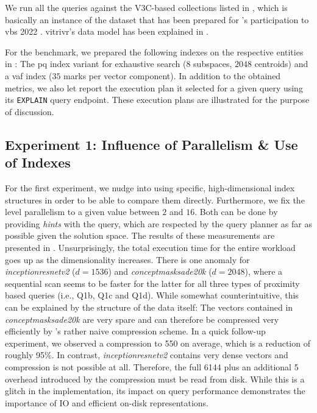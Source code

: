 We run all the queries against the V3C-based collections listed in , which is basically an instance of the dataset that has been prepared for \vitrivr{}'s \cite{Rossetto:2016Vitrivr,Gasser:2019Multimodal} participation to \acrshort{vbs} 2022 \cite{Heller:2022Multi}. vitrivr's data model has been explained in . 

For the benchmark, we prepared the following indexes on the respective entities in \cottontail{}: The \acrshort{pq} index variant for exhaustive search ($8$ subspaces, $2048$ centroids) and a \acrshort{vaf} index ($35$ marks per vector component). In addition to the obtained metrics, we also let \cottontail{} report the execution plan it selected for a given query using its \texttt{EXPLAIN} query endpoint. These execution plans are illustrated for the purpose of discussion.

\subsection{Experiment 1: Influence of Parallelism \& Use of Indexes}
For the first experiment, we nudge \cottontail{} into using specific, high-dimensional index structures in order to be able to compare them directly. Furthermore, we fix the level parallelism to a given value between $2$ and $16$. Both can be done by providing \emph{hints} with the query, which are respected by the query planner as far as possible given the solution space. The results of these measurements are presented in . Unsurprisingly, the total execution time for the entire workload goes up as the dimensionality increases. There is one anomaly for \emph{inceptionresnetv2} ($d = 1536$) and \emph{conceptmasksade20k} ($d = 2048$), where a sequential scan seems to be faster for the latter for all three types of proximity based queries (i.e., Q1b, Q1c and Q1d). While somewhat counterintuitive, this can be explained by the structure of the data itself: The vectors contained in \emph{conceptmasksade20k} are very spare and can therefore be compressed very efficiently by \cottontail{}'s rather naive compression scheme. In a quick follow-up experiment, we observed a compression to \SI{550}{\byte} on average, which is a reduction of roughly 95\%. In contrast, \emph{inceptionresnetv2} contains very dense vectors and compression is not possible at all. Therefore, the full \SI{6144}{\byte} plus an additional \SI{5}{\byte} overhead introduced by the compression must be read from disk. While this is a glitch in the implementation, its impact on query performance demonstrates the importance of IO and efficient on-disk representations.

